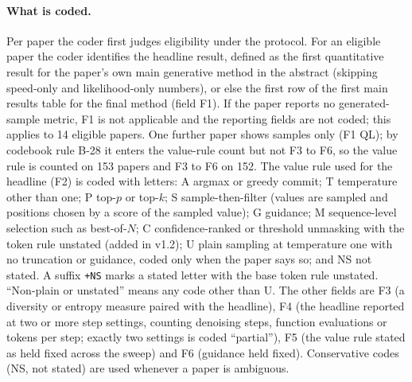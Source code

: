 \documentclass[acmsmall,screen]{acmart}
\begin{document}
\paragraph{What is coded.}
Per paper the coder first judges eligibility under the protocol. For an eligible paper the coder identifies the headline result, defined as the first quantitative result for the paper's own main generative method in the abstract (skipping speed-only and likelihood-only numbers), or else the first row of the first main results table for the final method (field F1). %
If the paper reports no generated-sample metric, F1 is not applicable and the reporting fields are not coded; this applies to 14 eligible papers. One further paper shows samples only (F1 QL); by codebook rule B-28 it enters the value-rule count but not F3 to F6, so the value rule is counted on 153 papers and F3 to F6 on 152. %
The value rule used for the headline (F2) is coded with letters: A argmax or greedy commit; T temperature other than one; P top-$p$ or top-$k$; S sample-then-filter (values are sampled and positions chosen by a score of the sampled value); G guidance; M sequence-level selection such as best-of-$N$; C confidence-ranked or threshold unmasking with the token rule unstated (added in v1.2); U plain sampling at temperature one with no truncation or guidance, coded only when the paper says so; and NS not stated. A suffix \texttt{+NS} marks a stated letter with the base token rule unstated. %
``Non-plain or unstated'' means any code other than U. The other fields are F3 (a diversity or entropy measure paired with the headline), F4 (the headline reported at two or more step settings, counting denoising steps, function evaluations or tokens per step; exactly two settings is coded ``partial''), F5 (the value rule stated as held fixed across the sweep) and F6 (guidance held fixed). %
Conservative codes (NS, not stated) are used whenever a paper is ambiguous. %
\end{document}
